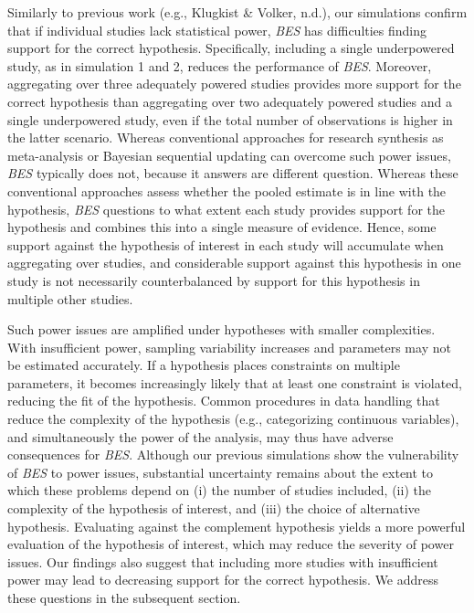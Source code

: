 \documentclass[
]{interact}
\begin{document}
Similarly to previous work (e.g., Klugkist \& Volker, n.d.), our
simulations confirm that if individual studies lack statistical power,
\emph{BES} has difficulties finding support for the correct hypothesis.
Specifically, including a single underpowered study, as in simulation 1
and 2, reduces the performance of \emph{BES}. Moreover, aggregating over
three adequately powered studies provides more support for the correct
hypothesis than aggregating over two adequately powered studies and a
single underpowered study, even if the total number of observations is
higher in the latter scenario. Whereas conventional approaches for
research synthesis as meta-analysis or Bayesian sequential updating can
overcome such power issues, \emph{BES} typically does not, because it
answers are different question. Whereas these conventional approaches
assess whether the pooled estimate is in line with the hypothesis,
\emph{BES} questions to what extent each study provides support for the
hypothesis and combines this into a single measure of evidence. Hence,
some support against the hypothesis of interest in each study will
accumulate when aggregating over studies, and considerable support
against this hypothesis in one study is not necessarily counterbalanced
by support for this hypothesis in multiple other studies.

Such power issues are amplified under hypotheses with smaller
complexities. With insufficient power, sampling variability increases
and parameters may not be estimated accurately. If a hypothesis places
constraints on multiple parameters, it becomes increasingly likely that
at least one constraint is violated, reducing the fit of the hypothesis.
Common procedures in data handling that reduce the complexity of the
hypothesis (e.g., categorizing continuous variables), and simultaneously
the power of the analysis, may thus have adverse consequences for
\emph{BES}. Although our previous simulations show the vulnerability of
\emph{BES} to power issues, substantial uncertainty remains about the
extent to which these problems depend on (i) the number of studies
included, (ii) the complexity of the hypothesis of interest, and (iii)
the choice of alternative hypothesis. Evaluating against the complement
hypothesis yields a more powerful evaluation of the hypothesis of
interest, which may reduce the severity of power issues. Our findings
also suggest that including more studies with insufficient power may
lead to decreasing support for the correct hypothesis. We address these
questions in the subsequent section.
\end{document}
